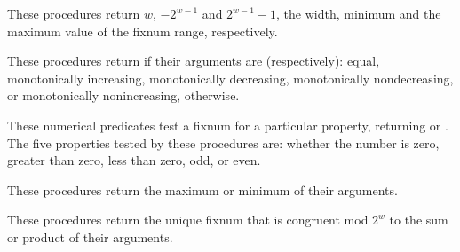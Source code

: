 \begin{entry}{%
}

These procedures return $w$,
$-2^{w-1}$ and $2^{w-1} - 1$, the
width, minimum and the maximum value of the fixnum range, respectively.
\end{entry}

\begin{entry}{%
}

These procedures return \schtrue{} if their arguments are (respectively):
equal, monotonically increasing, monotonically decreasing,
monotonically nondecreasing, or monotonically nonincreasing,
\schfalse{} otherwise.
\end{entry}

\begin{entry}{%
}

These numerical predicates test a fixnum for a particular property,
returning \schtrue{} or \schfalse{}.  The five properties tested by
these procedures are: whether the number is zero, greater than zero,
less than zero, odd, or even.
\end{entry}

\begin{entry}{%
}

These procedures return the maximum or minimum of their arguments.
\end{entry}

\begin{entry}{%
}

These procedures return the unique fixnum that is congruent mod $2^w$
to the sum or product of their arguments.
\end{entry}


